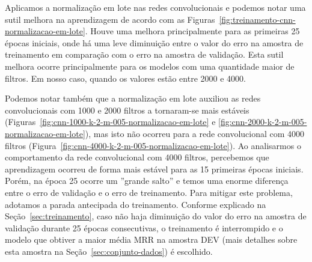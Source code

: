 Aplicamos a normalização em lote nas redes convolucionais e podemos notar uma sutil melhora na aprendizagem de acordo com as Figuras~\ref{fig:treinamento-cnn-normalizacao-em-lote}. Houve uma melhora principalmente para as primeiras 25 épocas iniciais, onde há uma leve diminuição entre o valor do erro na amostra de treinamento em comparação com o erro na amostra de validação. Esta sutil melhora ocorre principalmente para os modelos com uma quantidade maior de filtros. Em nosso caso, quando os valores estão entre 2000 e 4000.

Podemos notar também que a normalização em lote auxiliou as redes convolucionais com 1000 e 2000 filtros a tornaram-se mais estáveis (Figuras~\ref{fig:cnn-1000-k-2-m-005-normalizacao-em-lote} e \ref{fig:cnn-2000-k-2-m-005-normalizacao-em-lote}), mas isto não ocorreu para a rede convolucional com 4000 filtros (Figura~\ref{fig:cnn-4000-k-2-m-005-normalizacao-em-lote}). Ao analisarmos o comportamento da rede convolucional com 4000 filtros, percebemos que aprendizagem ocorreu de forma mais estável para as 15 primeiras épocas iniciais. Porém, na época 25 ocorre um ''grande salto'' e temos uma enorme diferença entre o erro de validação e o erro de treinamento. Para mitigar este problema, adotamos a parada antecipada do treinamento. Conforme explicado na Seção~\ref{sec:treinamento}, caso não haja diminuição do valor do erro na amostra de validação durante 25 épocas consecutivas, o treinamento é interrompido e o modelo que obtiver a maior média MRR na amostra DEV (mais detalhes sobre esta amostra na Seção~\ref{sec:conjunto-dados}) é escolhido.

